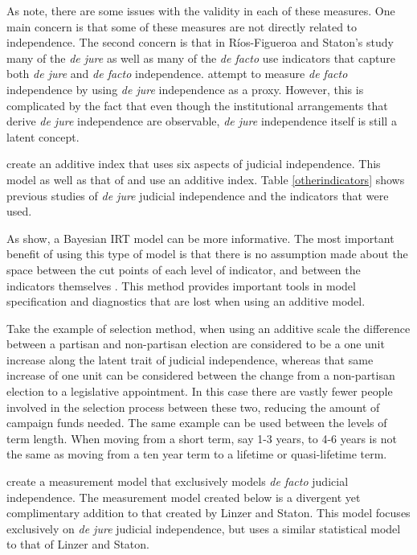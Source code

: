 \documentclass[12pt]{article}
\begin{document}
\doublespacing\normalsize

As \citet{Rios2014} note, there are some issues with the validity in each of these measures.  One main concern is that some of these measures are not directly related to independence.  The second concern is that in R\'{i}os-Figueroa and Staton's study many of the \textit{de jure} as well as many of the \textit{de facto} use indicators that capture both \textit{de jure} and \textit{de facto} independence.  \citealt{Laporta2004} attempt to measure \textit{de facto} independence by using \textit{de jure} independence as a proxy.  However, this is complicated by the fact that even though the institutional arrangements that derive \textit{de jure} independence are observable, \textit{de jure} independence itself is still a latent concept. 

\citet*{Melton2014} create an additive index that uses six aspects of judicial independence.  This model as well as that of \citet*{Feld2003} and \citet*{Keith2002b} use an additive index.  Table \ref{otherindicators} shows previous studies of \textit{de jure} judicial independence and the indicators that were used.   

As \citet{Linzer2014} show, a Bayesian IRT model can be more informative.  The most important benefit of using this type of model is that there is no assumption made about the space between the cut points of each level of indicator, and between the indicators themselves \citep{Jackman2008,Schnakenberg2014}.  This method provides important tools in model specification and diagnostics that are lost when using an additive model.

Take the example of selection method, when using an additive scale the difference between a partisan and non-partisan election are considered to be a one unit increase along the latent trait of judicial independence, whereas that same increase of one unit can be considered between the change from a non-partisan election to a legislative appointment.  In this case there are vastly fewer people involved in the selection process between these two, reducing the amount of campaign funds needed.  The same example can be used between the levels of term length.  When moving from a short term, say 1-3 years, to 4-6 years is not the same as moving from a ten year term to a lifetime or quasi-lifetime term.

\citet*{Linzer2014} create a measurement model that exclusively models \textit{de facto} judicial independence.  The measurement model created below is a divergent yet complimentary addition to that created by Linzer and Staton.  This model focuses exclusively on \textit{de jure} judicial independence, but uses a similar statistical model to that of Linzer and Staton.  
\end{document}
